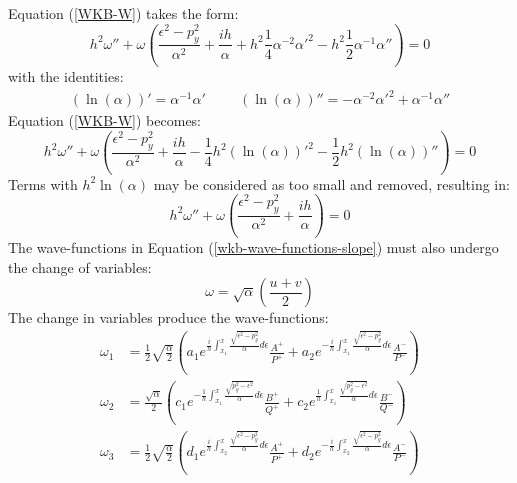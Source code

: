 		Equation (\ref{WKB-W}) takes the form:
		\begin{equation}
			h^{2}\omega''+\omega\left(\frac{\epsilon^{2}-p_{y}^{2}}{\alpha^{2}}+\frac{ih}{\alpha}+h^{2}\frac{1}{4}\alpha^{-2}\alpha'^{2}-h^{2}\frac{1}{2}\alpha^{-1}\alpha''\right)=0
		\end{equation}
		with the identities:
		\begin{align}
			\left(\ln(\alpha)\right)'=\alpha^{-1}\alpha'
			\hspace{1cm}
			\left(\ln(\alpha)\right)''=-\alpha^{-2}\alpha'^{2}+\alpha^{-1}\alpha''
		\end{align}
		Equation (\ref{WKB-W}) becomes:
		\begin{equation}
			h^{2}\omega''+\omega\left(\frac{\epsilon^{2}-p_{y}^{2}}{\alpha^{2}}+\frac{ih}{\alpha}-\frac{1}{4}h^{2}\left(\ln(\alpha)\right)'^{2}-\frac{1}{2}h^{2}\left(\ln(\alpha)\right)''\right)=0
		\end{equation}
		Terms with $h^{2} \ln(\alpha)$ may be considered as too small and removed, resulting in:
		\begin{equation}
			h^{2}\omega''+\omega\left(\frac{\epsilon^{2}-p_{y}^{2}}{\alpha^{2}}+\frac{ih}{\alpha}\right)=0
			\label{WKB-w}
		\end{equation}
		The wave-functions in Equation (\ref{wkb-wave-functions-slope}) must also undergo the change of variables:
		\begin{equation}
			\omega=\sqrt{\alpha}\left(\frac{u+v}{2}\right)
		\end{equation}
		The change in variables produce the wave-functions:
		\begin{align}
			\omega_{1}&=\frac{1}{2}\sqrt{\frac{\alpha}{2}}\left(a_{1}e^{\frac{i}{h}\int^{x}_{x_{1}} \frac{\sqrt{\epsilon^{2}-p_{y}^{2}}}{\alpha}d\epsilon}\frac{A^{+}}{P^{+}}+a_{2}e^{-\frac{i}{h}\int^{x}_{x_{1}} \frac{\sqrt{\epsilon^{2}-p_{y}^{2}}}{\alpha}d\epsilon}\frac{A^{-}}{P^{-}}\right)\\
			\omega_{2}&=\frac{\sqrt{\alpha}}{2}\left(c_{1}e^{-\frac{1}{h}\int^{x}_{x_1}\frac{\sqrt{p_{y}^{2}-\epsilon^{2}}}{\alpha}d\epsilon}\frac{B^{+}}{Q^{+}}+c_{2}e^{\frac{1}{h}\int^{x}_{x_1}\frac{\sqrt{p_{y}^{2}-\epsilon^{2}}}{\alpha}d\epsilon}\frac{B^{-}}{Q^{-}}\right)\\
			\omega_{3}&=\frac{1}{2}\sqrt{\frac{\alpha}{2}}\left(d_{1}e^{\frac{i}{h}\int^{x}_{x_{2}} \frac{\sqrt{\epsilon^{2}-p_{y}^{2}}}{\alpha}d\epsilon}\frac{A^{+}}{P^{+}}+d_{2}e^{-\frac{i}{h}\int^{x}_{x_{2}} \frac{\sqrt{\epsilon^{2}-p_{y}^{2}}}{\alpha}d\epsilon}\frac{A^{-}}{P^{-}}\right)
			\label{WKB-change-variable}
		\end{align}
